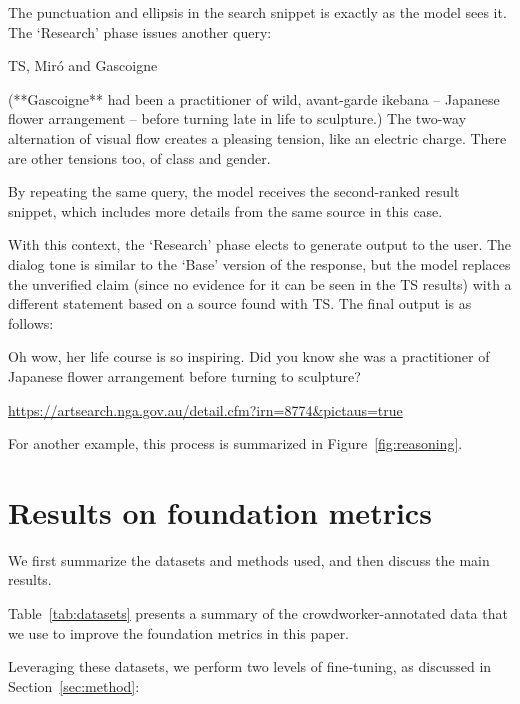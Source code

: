 The punctuation and ellipsis in the search snippet is exactly as the model sees it. The `Research' phase issues another query:

\begin{dialogue}
 TS, Mir\'o and Gascoigne

 (**Gascoigne** had been a practitioner of wild, avant-garde ikebana – Japanese flower arrangement – before turning late in life to sculpture.) The two-way alternation of visual flow creates a pleasing tension, like an electric charge. There are other tensions too, of class and gender. \par \texttt{}
\end{dialogue}

By repeating the same query, the model receives the second-ranked result snippet, which includes more details from the same source in this case.

With this context, the ‘Research’ phase elects to generate output to the user. The dialog tone is similar to the `Base' version of the response, but the model replaces the unverified claim (since no evidence for it can be seen in the TS results) with a different statement based on a source found with TS. The final output is as follows:

\begin{dialogue}
 Oh wow, her life course is so inspiring. Did you know she was a practitioner of Japanese flower arrangement before turning to sculpture? \par \url{https://artsearch.nga.gov.au/detail.cfm?irn=8774&pictaus=true}
\end{dialogue}

For another example, this process is summarized in Figure~\ref{fig:reasoning}.

\section{Results on foundation metrics}
\label{sec:results}

We first summarize the datasets and methods used, and then discuss the main results. 

Table~\ref{tab:datasets} presents a summary of the crowdworker-annotated data that we use to improve the foundation metrics in this paper.

Leveraging these datasets, we perform two levels of fine-tuning, as discussed in Section~\ref{sec:method}:

